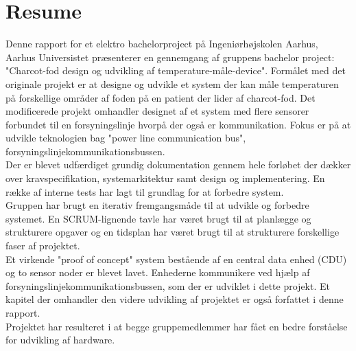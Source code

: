 \chapter{Resume}
Denne rapport for et elektro bachelorproject på Ingeniørhøjskolen Aarhus, Aarhus Universistet præsenterer en gennemgang af gruppens bachelor project: "Charcot-fod design og udvikling af temperature-måle-device". Formålet med det originale projekt er at designe og udvikle et system der kan måle temperaturen på forskellige områder af foden på en patient der lider af charcot-fod. Det modificerede projekt omhandler designet af et system med flere sensorer forbundet til en forsyningslinje hvorpå der også er kommunikation. Fokus er på at udvikle teknologien bag "power line communication bus", forsyningslinjekommunikationsbussen.\\
Der er blevet udfærdiget grundig dokumentation gennem hele forløbet der dækker over kravspecifikation, systemarkitektur samt design og implementering. En række af interne tests har lagt til grundlag for at forbedre system.\\
Gruppen har brugt en iterativ fremgangsmåde til at udvikle og forbedre systemet. En SCRUM-lignende tavle har været brugt til at planlægge og strukturere opgaver og en tidsplan har været brugt til at strukturere forskellige faser af projektet.\\
Et virkende "proof of concept" system bestående af en central data enhed (CDU) og to sensor noder er blevet lavet. Enhederne kommunikere ved hjælp af  forsyningslinjekommunikationsbussen, som der er udviklet i dette projekt. Et kapitel der omhandler den videre udvikling af projektet er også forfattet i denne rapport.\\
Projektet har resulteret i at begge gruppemedlemmer har fået en bedre forståelse for udvikling af hardware.